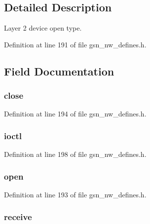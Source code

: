 \subsection{Detailed Description}
Layer 2 device open type. 

Definition at line 191 of file gsn\_\-nw\_\-defines.h.



\subsection{Field Documentation}
\hypertarget{a00107_a92702f236d576e1cf7f87031261275ec}{
\subsubsection[{close}]{ {\bf close}}}
\label{a00107_a92702f236d576e1cf7f87031261275ec}


Definition at line 194 of file gsn\_\-nw\_\-defines.h.

\hypertarget{a00107_ab88d33546af7b71faeb7d6cb14ef8a64}{
\subsubsection[{ioctl}]{ {\bf ioctl}}}
\label{a00107_ab88d33546af7b71faeb7d6cb14ef8a64}


Definition at line 198 of file gsn\_\-nw\_\-defines.h.

\hypertarget{a00107_a62bed8fd3babf97e0d6dce6f4dd163e1}{
\subsubsection[{open}]{ {\bf open}}}
\label{a00107_a62bed8fd3babf97e0d6dce6f4dd163e1}


Definition at line 193 of file gsn\_\-nw\_\-defines.h.

\hypertarget{a00107_ae8f5ffcd1fb58ffea839d087f0c36ec1}{
\subsubsection[{receive}]{ {\bf receive}}}
\label{a00107_ae8f5ffcd1fb58ffea839d087f0c36ec1}


